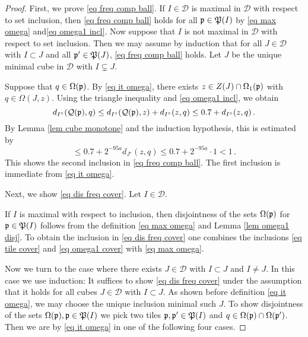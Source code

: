 \begin{proof}
    First, we prove \eqref{eq freq comp ball}. If $I \in \mathcal{D}$ is maximal in $\mathcal{D}$ with respect to set inclusion, then \eqref{eq freq comp ball} holds for all $\mathfrak p \in \mathfrak P(I)$ by \eqref{eq max omega} and\eqref{eq omega1 incl}. Now suppose that $I$ is not maximal in $\mathcal{D}$ with respect to set inclusion. Then we may assume by induction that for all $J \in \mathcal{D}$ with $I \subset J$ and all $\mathfrak p' \in \mathfrak P(J)$, \eqref{eq freq comp ball} holds. Let $J$ be the unique minimal cube in $\mathcal{D}$ with $I \subsetneq J$.

    Suppose that $q \in \Omega(\mathfrak p)$.  By \eqref{eq it omega}, there exists $z \in Z(J) \cap \Omega_1(\mathfrak p)$ with $q \in \Omega(J,z)$. Using the triangle inequality and \eqref{eq omega1 incl}, we obtain
    $$
        d_{I^\circ}(\mathcal{Q}(\mathfrak p),q) \le d_{I^\circ}(\mathcal{Q}(\mathfrak p), z) + d_{I^\circ}(z, q) \le 0.7 + d_{I^\circ}(z, q)\,.
    $$
    By Lemma \ref{lem cube monotone} and the induction hypothesis, this is estimated by
    $$
        \le 0.7 + 2^{-95a} d_{J^\circ}(z,q) \le 0.7 + 2^{-95a}\cdot 1 < 1\,.
    $$
    This shows the second inclusion in \eqref{eq freq comp ball}. The first inclusion is immediate from \eqref{eq it omega}.

    Next, we show \eqref{eq dis freq cover}. Let $I \in \mathcal{D}$.

    If $I$ is maximal with respect to inclusion, then disjointness of the sets $\Omega(\mathfrak p)$ for $\mathfrak p \in \mathfrak P(I)$ follows from the definition \eqref{eq max omega} and Lemma \ref{lem omega1 disj}. To obtain the inclusion in \eqref{eq dis freq cover} one combines the inclusions \eqref{eq tile cover} and \eqref{eq omega1 cover} with  \eqref{eq max omega}.

    Now we turn to the case where there exists $J \in \mathcal{D}$ with $I \subset J$ and $I\ne J$. In this case we use induction: It suffices to show \eqref{eq dis freq cover} under the assumption that it holds for all cubes $J \in \mathcal{D}$ with $I \subset J$. As shown before definition \eqref{eq it omega}, we may choose the unique inclusion minimal such $J$. To show disjointness of the sets $\Omega(\mathfrak p), \mathfrak p \in \mathfrak P(I)$ we pick two tiles $\mathfrak p, \mathfrak p' \in \mathfrak P(I)$ and $q \in \Omega(\mathfrak p) \cap \Omega(\mathfrak p')$.
    Then we are by \eqref{eq it omega} in one of the following four cases.


\end{proof}
